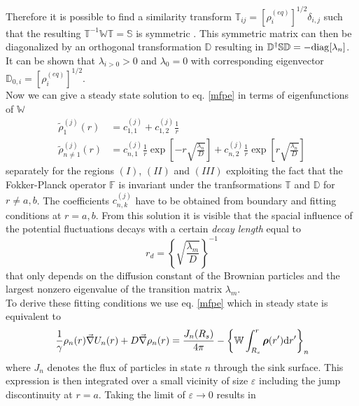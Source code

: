 \documentclass[twocolumn,superscriptaddress]{revtex4}
\newcommand{\vect}[1]{\boldsymbol{\mathbf{#1}}}
\begin{document}
Therefore it is possible to find a similarity transform $\mathbb{T}_{ij}=[\rho_i^{(eq)}]^{1/2}\delta_{i,j}$ such that the resulting $\mathbb{T}^{-1}\mathbb{W}\mathbb{T} = \mathbb{S}$ is symmetric \cite{Oppenheim1977}. This symmetric matrix can then be diagonalized by an orthogonal transformation $\mathbb{D}$ resulting in $\mathbb{D}^{\dagger}\mathbb{S}\mathbb{D} = - {\rm diag}[\lambda_n]$. It can be shown \cite{VanKampen1992} that $\lambda_{i>0}>0$ and $\lambda_0=0$ with corresponding eigenvector $\mathbb{D}_{0,i}=[\rho_i^{(eq)}]^{1/2}$.  \\
Now we can give a steady state solution to eq. \eqref{mfpe} in terms of eigenfunctions of $\mathbb{W}$
\begin{align}
    \label{solution}
    \tilde{\rho}_{1}^{(j)}(r) &= c_{1,1}^{(j)} + c_{1,2}^{(j)} \frac{1}{r} \\
    \tilde{\rho}_{n \ne 1}^{(j)}(r) &= c_{n,1}^{(j)}\frac{1}{r} \exp\left[-r\sqrt{\frac{\lambda_n}{D}}\right] + c_{n,2}^{(j)}\frac{1}{r} \exp\left[r\sqrt{\frac{\lambda_n}{D}}\right]  \nonumber
\end{align}
separately for the regions $(I)$, $(II)$ and $(III)$ exploiting the fact that the Fokker-Planck operator $\mathbb{F}$ is invariant under the tranfsormations $\mathbb{T}$ and $\mathbb{D}$ for $r\ne a, b$. The coefficients $c^{(j)}_{n,k}$ have to be obtained from boundary and fitting conditions at $r=a,b$. From this solution it is visible that the spacial influence of the potential fluctuations decays with a certain \textit{decay length} equal to
\begin{equation}
    r_d = \left\{\sqrt{\frac{\lambda_m}{D}}\right\}^{-1}
    \label{decay_length}
\end{equation}
that only depends on the diffusion constant of the Brownian particles and the largest nonzero eigenvalue of the transition matrix $\lambda_m$.\\
To derive these fitting conditions we use eq. \eqref{mfpe} which in steady state is equivalent to
\begin{equation*}
     \frac{1}{\gamma}\rho_n(r) \vec{\nabla} U_n(r) + D \vec{\nabla} \rho_n(r) = \frac{J_n(R_s)}{4 \pi} - \left\{ \mathbb{W} \int_{R_s}^{r} \vect{\rho}(r') {\rm d} r' \right\}_{n}
\end{equation*}
where $J_n$ denotes the flux of particles in state $n$ through the sink surface. This expression is then integrated over a small vicinity of size $\varepsilon$ including the jump discontinuity at $r = a$. Taking the limit of $\varepsilon \rightarrow 0$ results in 
\end{document}
